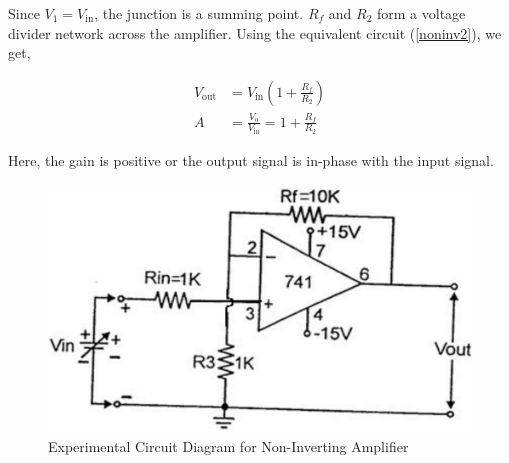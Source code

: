 Since $V_1 = V_\text{in}$, the junction is a  summing point. $R_f$ and $R_2$ form a voltage divider network across the amplifier. Using the equivalent circuit (\ref{noninv2}), we get,

\begin{align}
    V_\text{out} &= V_\text{in} \left(1+\frac{R_f}{R_2}\right) \nonumber\\
    A &= \frac{V_\text{o}}{V_\text{in}} = 1 + \frac{R_f}{R_2}
\end{align}

Here, the gain is positive or the output signal is in-phase with the input signal.



\begin{figure}[H]
    \centering
    \includegraphics[width=0.8\columnwidth]{images/noninv3.png}
    \caption{Experimental Circuit Diagram for Non-Inverting Amplifier}
    \label{noninv3}
\end{figure}


